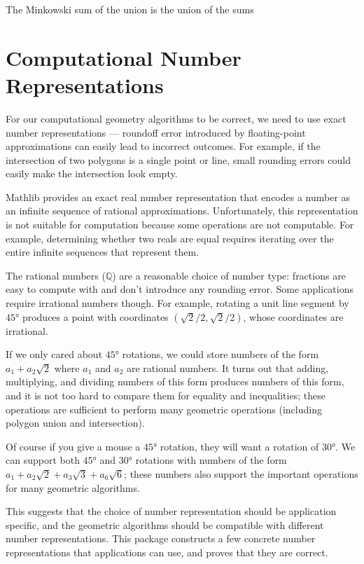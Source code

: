 \begin{theorem}
  \label{thm:minkowski_union}
  \notready
  The Minkowski sum of the union is the union of the sums
\end{theorem}

\chapter{Computational Number Representations}
\label{chap:numbers}

For our computational geometry algorithms to be correct, we need to use exact
number representations --- roundoff error introduced by floating-point
approximations can easily lead to incorrect outcomes.  For example,
if the intersection of two polygons is a single point or line, small rounding
errors could easily make the intersection look empty.

Mathlib provides an exact real number representation that encodes a number as
an infinite sequence of rational approximations. Unfortunately, this
representation is not suitable for computation because some operations are not
computable. For example, determining whether two reals are equal requires
iterating over the entire infinite sequences that represent them.

The rational numbers ($ℚ$) are a reasonable choice of number type: fractions are easy
to compute with and don't introduce any rounding error. Some applications
require irrational numbers though. For example, rotating a unit line segment by
$45°$ produces a point with coordinates $(\sqrt{2}/2, \sqrt{2}/2)$, whose
coordinates are irrational.

If we only cared about $45°$ rotations, we could store numbers of the
form $a_1 + a_2\sqrt{2}$ where $a_1$ and $a_2$ are rational numbers. It
turns out that adding, multiplying, and dividing numbers of this form produces
numbers of this form, and it is not too hard to compare them for equality and
inequalities; these operations are sufficient to perform many geometric
operations (including polygon union and intersection).

Of course if you give a mouse a $45°$ rotation, they will want a
rotation of $30°$. We can support both $45°$ and $30°$
rotations with numbers of the form
$a_1 + a_2\sqrt{2} + a_3\sqrt{3} + a_6\sqrt{6}$; these numbers also support the
important operations for many geometric algorithms.

This suggests that the choice of number representation should be application
specific, and the geometric algorithms should be compatible with different
number representations. This package constructs a few concrete number
representations that applications can use, and proves that they are correct.

